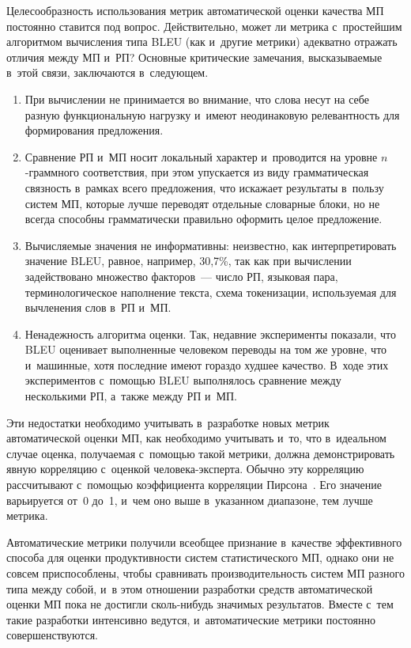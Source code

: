 \begin{multicols}{2}
  Целесообразность использования метрик автоматической оценки качества 
МП постоянно ставится под вопрос. Действительно, может ли метрика 
с~простейшим алгоритмом вычисления типа BLEU (как и~другие метрики) 
адекватно отражать отличия между МП и~РП? Основные критические 
замечания, высказываемые в~этой связи, заключаются в~следующем.
  \begin{enumerate}[1.]
  \item При вычислении не принимается во внимание, что слова несут на 
себе разную функциональную нагрузку и~имеют неодинаковую 
релевантность для формирования предложения.
  \item Сравнение РП и~МП носит локальный характер и~проводится на 
уровне $n$-грам\-мно\-го соответствия, при этом упускается из виду 
грамматическая связность в~рамках всего предложения, что искажает 
результаты в~пользу систем МП, которые лучше переводят отдельные 
словарные блоки, но не всегда способны грамматически правильно оформить 
целое предложение.
  \item Вычисляемые значения не информативны: неизвестно, как 
интерпретировать значение BLEU, равное, например, 30,7\%, так как при 
вычислении задействовано множество факторов~--- число РП, языковая пара, 
терминологическое наполнение текста, схема токенизации, используемая для 
вычленения слов в~РП и~МП.
  \item Ненадежность алгоритма оценки. Так, недавние эксперименты 
показали, что BLEU оценивает выполненные человеком переводы на том же 
уровне, что и~машинные, хотя последние имеют гораздо худшее качество. 
В~ходе этих экспериментов с~помощью BLEU выполнялось сравнение между 
несколькими РП, а~также между РП и~МП.
  \end{enumerate}
  
  Эти недостатки необходимо учитывать в~разработке новых метрик 
автоматической оценки МП, как необходимо учитывать и~то, что 
в~идеальном случае оценка, получаемая с~помощью такой мет\-ри\-ки, должна 
демонстрировать явную корреляцию с~оценкой че\-ло\-ве\-ка-экс\-пер\-та. 
Обычно эту корреляцию рассчитывают с~помощью коэффициента 
корреляции Пирсона~\cite[с.~61]{10-nur}. Его значение варьируется от~0 
до~1, и~чем оно выше в~указанном диапазоне, тем лучше метрика.
  
  Автоматические метрики получили всеобщее признание в~качестве 
эффективного способа для оценки продуктивности систем статистического 
МП, однако они не совсем приспособлены, чтобы сравнивать 
производительность систем МП разного типа между собой, и~в этом 
отношении разработки средств автоматической оценки МП пока не достигли 
сколь-нибудь значимых результатов. Вместе с~тем такие разработки 
интенсивно ведутся, и~автоматические метрики постоянно 
совершенствуются.
  

\end{multicols}
